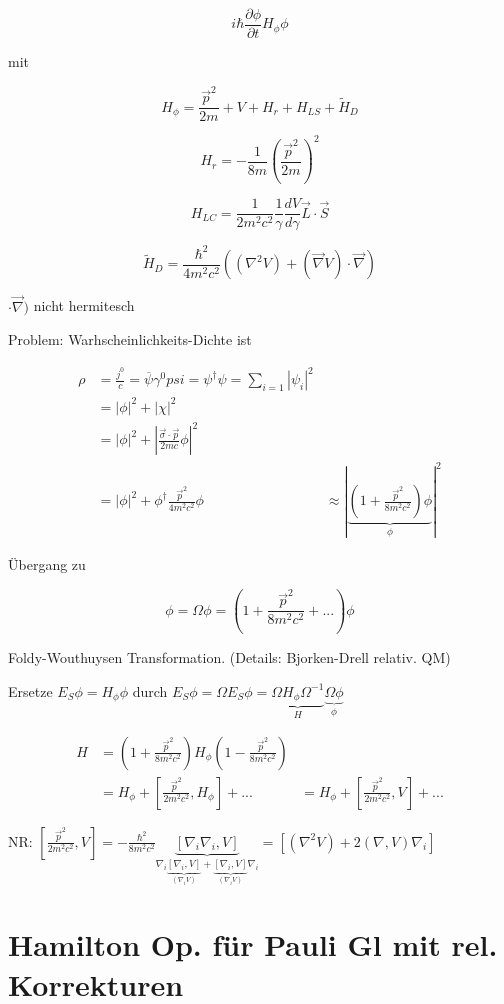 \[i\hbar \frac{\partial \phi}{\partial t} H_\phi \phi\]


mit 

\[H_\phi = \frac{\vec p^2}{2m}+V+H_r+H_{LS}+\tilde H_D\]

\[H_r = -\frac{1}{8m}\left(\frac{\vec p^2}{2m}\right)^2\]

\[H_{LC} = \frac{1}{2m^2c^2}\frac{1}{\gamma}\frac{dV}{d\gamma}\vec L\cdot\vec S\]

\[\tilde H_D = \frac{\hbar^2}{4m^2c^2}((\nabla^2V)+(\vec\nabla V)\cdot\vec\nabla)\]

\(\cdot\vec\nabla)\) nicht hermitesch

Problem: Warhscheinlichkeits-Dichte ist

\begin{align}
\rho &= \frac{j^0}{c}=\overline \psi\gamma^0psi = \psi^\dagger\psi = \sum_{i=1}|\psi_i|^2\\
&=|\phi|^2 + |\chi|^2\\
&=|\phi|^2+|\frac{\vec\sigma\cdot\vec p}{2mc}\phi|^2\\
&=|\phi|^2+\phi^\dagger \frac{\vec p^2}{4m^2c^2}\phi
&\approx |\underbrace{(1+\frac{\vec p^2}{8m^2c^2})\phi}_{\phi}|^2
\end{align}

Übergang zu 

\[\phi = \Omega\phi = (1+\frac{\vec p^2}{8m^2c^2}+...)\phi\]

Foldy-Wouthuysen Transformation. (Details: Bjorken-Drell relativ. QM)

Ersetze \(E_S\phi = H_\phi \phi\) durch \(E_S\phi =\Omega E_S\phi = \underbrace{\Omega H_\phi\Omega^{-1}}_{H}\underbrace{\Omega\phi}_{\phi}\)

\begin{align}
H&=(1+\frac{\vec p^2}{8m^2c^2})H_\phi (1-\frac{\vec p^2}{8m^2c^2}) \\
&=H_\phi + [\frac{\vec p^2}{2m^2c^2},H_\phi]+...
&=H_\phi + [\frac{\vec p^2}{2m^2c^2},V]+...
\end{align}

NR: \([\frac{\vec p^2}{2m^2c^2},V]=-\frac{\hbar^2}{8m^2c^2}\underbrace{[\nabla_i\nabla_i,V]}_{\nabla_i\underbrace{[\nabla_i,V]}_{(\nabla_iV)}+\underbrace{[\nabla_i,V]}_{(\nabla_iV)}\nabla_i} = [(\nabla^2 V)+2(\nabla,V)\nabla_i]\)


\section{Hamilton Op. für Pauli Gl mit rel. Korrekturen}

